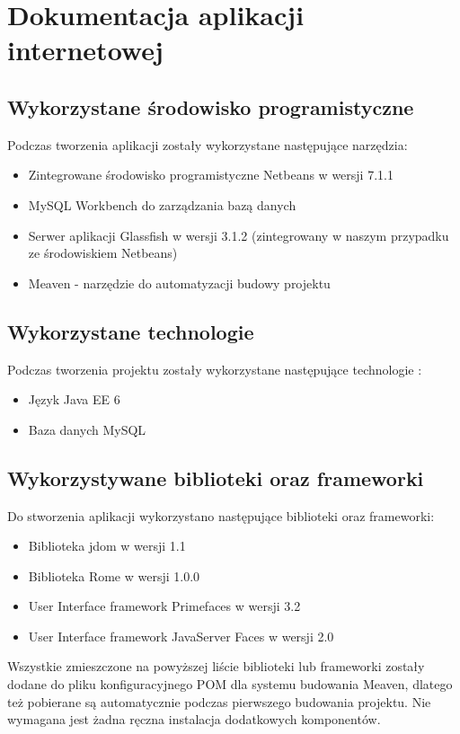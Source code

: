\documentclass[a4paper]{article}
\begin{document}
\pagebreak

\section{Dokumentacja aplikacji internetowej}

\subsection{Wykorzystane środowisko programistyczne}

Podczas tworzenia aplikacji zostały wykorzystane następujące narzędzia:
\begin{itemize}
 \item Zintegrowane środowisko programistyczne Netbeans w wersji 7.1.1
 \item MySQL Workbench do zarządzania bazą danych
 \item Serwer aplikacji Glassfish w wersji 3.1.2 (zintegrowany w naszym przypadku ze środowiskiem Netbeans)
 \item Meaven - narzędzie do automatyzacji budowy projektu
\end{itemize}

\subsection{Wykorzystane technologie}
Podczas tworzenia projektu zostały wykorzystane następujące technologie :
\begin{itemize}
 \item Język Java EE 6
 \item Baza danych MySQL
\end{itemize}


\subsection{Wykorzystywane biblioteki oraz frameworki}
Do stworzenia aplikacji wykorzystano następujące biblioteki oraz frameworki:
\begin{itemize}
 \item Biblioteka jdom w wersji 1.1
 \item Biblioteka Rome w wersji 1.0.0
 \item User Interface framework Primefaces w wersji 3.2 
 \item User Interface framework JavaServer Faces w wersji 2.0
\end{itemize}

Wszystkie zmieszczone na powyższej liście biblioteki lub frameworki zostały dodane do pliku konfiguracyjnego 
POM dla systemu budowania Meaven, dlatego też pobierane są automatycznie podczas pierwszego budowania projektu.
Nie wymagana jest żadna ręczna instalacja dodatkowych komponentów.
\end{document}
